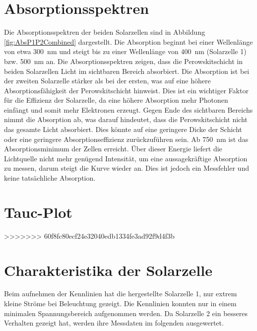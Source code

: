 \documentclass[12pt,a4paper,ngerman]{report}
\begin{document}
	\section{Absorptionsspektren}
		Die Absorptionsspektren der beiden Solarzellen sind in Abbildung \ref{fig:AbsP1P2Combined} dargestellt. Die Absorption beginnt bei einer Wellenlänge von etwa \SI{300}{\nano\meter} und steigt bis zu einer Wellenlänge von \SI{400}{\nano\meter} (Solarzelle 1) bzw. \SI{500}{\nano\meter} an. Die Absorptionsspektren zeigen, dass die Perowskitschicht in beiden Solarzellen Licht im sichtbaren Bereich absorbiert. Die Absorption ist bei der zweiten Solarzelle stärker als bei der ersten, was auf eine höhere Absorptionsfähigkeit der Perowskitschicht hinweist. Dies ist ein wichtiger Faktor für die Effizienz der Solarzelle, da eine höhere Absorption mehr Photonen einfängt und somit mehr Elektronen erzeugt.
		Gegen Ende des sichtbaren Bereichs nimmt die Absorption ab, was darauf hindeutet, dass die Perowskitschicht nicht das gesamte Licht absorbiert. Dies könnte auf eine geringere Dicke der Schicht oder eine geringere Absorptionseffizienz zurückzuführen sein.
		Ab \SI{750}{\nano\meter} ist das Absorptionsminimum der Zellen erreicht. Über dieser Energie liefert die Lichtquelle nicht mehr genügend Intensität, um eine aussagekräftige Absorption zu messen, darum steigt die Kurve wieder an. Dies ist jedoch ein Messfehler und keine tatsächliche Absorption.		

	\section{Tauc-Plot}

>>>>>>> 60f8fc80ecf24e32040edb1334fe3ad92f9d4f3b

\section{Charakteristika der Solarzelle}
Beim aufnehmen der Kennlinien hat die hergestellte Solarzelle 1, nur extrem kleine Ströme bei Beleuchtung gezeigt. Die Kennlinien konnten nur in einem minimalen Spannungsbereich aufgenommen werden. Da Solarzelle 2 ein besseres Verhalten gezeigt hat, werden ihre Messdaten im folgenden ausgewertet.\\
\end{document}

